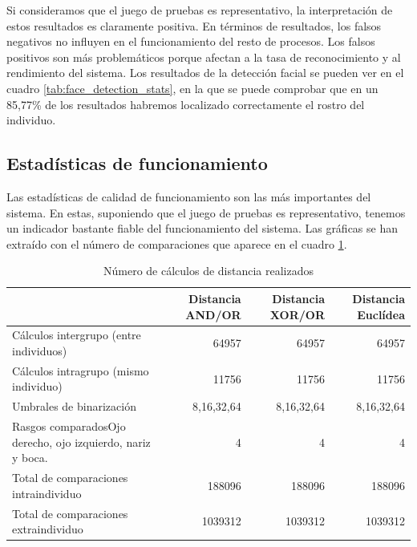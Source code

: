 Si consideramos que el juego de pruebas es representativo, la interpretación de estos resultados es claramente positiva. En términos de resultados, los falsos negativos no influyen en el funcionamiento del resto de procesos. Los falsos positivos son más problemáticos porque afectan a la tasa de reconocimiento y al rendimiento del sistema. Los resultados de la detección facial se pueden ver en el cuadro \ref{tab:face_detection_stats}, en la que se puede comprobar que en un 85,77\% de los resultados habremos localizado correctamente el rostro del individuo.

\subsection{Estadísticas de funcionamiento}
Las estadísticas de calidad de funcionamiento son las más importantes del sistema. En estas, suponiendo que el juego de pruebas es representativo, tenemos un indicador bastante fiable del funcionamiento del sistema. Las gráficas se han extraído con el número de comparaciones que aparece en el cuadro \ref{tab:distance_calc_stats}.

\begin{table}[!htb]
	\begin{tabular}{|l|r|r|r|}
		\hline
		& Distancia AND/OR & Distancia XOR/OR & Distancia Euclídea \\
		\hline \hline
		Cálculos intergrupo (entre individuos) & 64957 & 64957 & 64957\\
		Cálculos intragrupo (mismo individuo) & 11756 & 11756 & 11756 \\
		Umbrales de binarización & 8,16,32,64 & 8,16,32,64 & 8,16,32,64 \\
		Rasgos comparados\tiny{Ojo derecho, ojo izquierdo, nariz y boca.} & 4 & 4 & 4 \\
		\hline
		Total de comparaciones intraindividuo & 188096 & 188096 & 188096 \\
		Total de comparaciones extraindividuo & 1039312 & 1039312 & 1039312 \\
		\hline
	\end{tabular}
	\caption{Número de cálculos de distancia realizados}
	\label{tab:distance_calc_stats}
\end{table}


